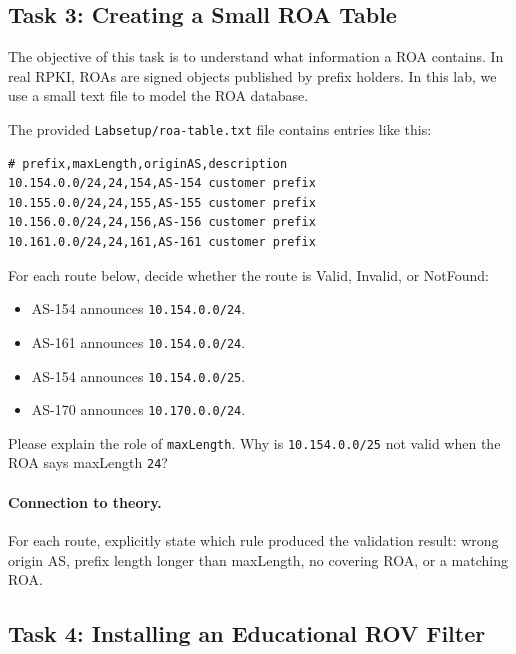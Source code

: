 \subsection{Task 3: Creating a Small ROA Table}

The objective of this task is to understand what information a ROA contains. In
real RPKI, ROAs are signed objects published by prefix holders. In this lab, we
use a small text file to model the ROA database.

The provided \texttt{Labsetup/roa-table.txt} file contains entries like this:

\begin{lstlisting}
# prefix,maxLength,originAS,description
10.154.0.0/24,24,154,AS-154 customer prefix
10.155.0.0/24,24,155,AS-155 customer prefix
10.156.0.0/24,24,156,AS-156 customer prefix
10.161.0.0/24,24,161,AS-161 customer prefix
\end{lstlisting}

For each route below, decide whether the route is Valid, Invalid, or NotFound:

\begin{itemize}[noitemsep]
\item AS-154 announces \texttt{10.154.0.0/24}.
\item AS-161 announces \texttt{10.154.0.0/24}.
\item AS-154 announces \texttt{10.154.0.0/25}.
\item AS-170 announces \texttt{10.170.0.0/24}.
\end{itemize}

Please explain the role of \texttt{maxLength}. Why is
\texttt{10.154.0.0/25} not valid when the ROA says maxLength \texttt{24}?

\paragraph{Connection to theory.}
For each route, explicitly state which rule produced the validation result:
wrong origin AS, prefix length longer than maxLength, no covering ROA, or a
matching ROA.


\subsection{Task 4: Installing an Educational ROV Filter}

